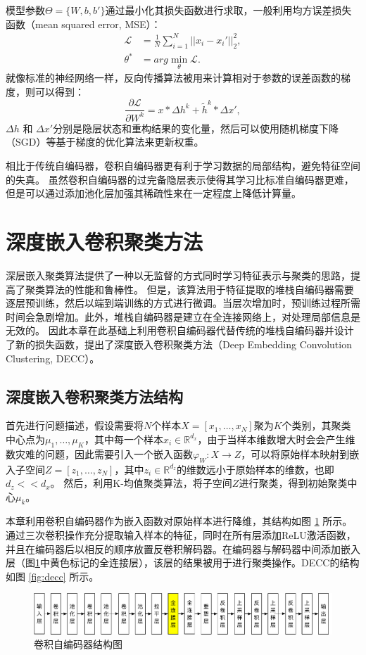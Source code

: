 模型参数$\Theta=\{{W},{b},{b'}\}$通过最小化其损失函数进行求取，一般利用均方误差损失函数（mean squared error, MSE）：
\begin{align}
	\mathscr{L} &= \frac{1}{N}\sum_{i=1}^N||x_i-x_i'||_2^2, \label{equ:mse_loss}\\
	\theta^* &= arg\min\limits_{\theta} \mathscr{L}.  \label{equ:mse}
\end{align}
就像标准的神经网络一样，反向传播算法被用来计算相对于参数的误差函数的梯度，则可以得到：
\begin{equation}
	\frac{\partial \mathscr{L}}{\partial W^k}=x * \Delta h ^k+\tilde{h}^k * \Delta x',
\end{equation}
$\Delta h$ 和 $\Delta x'$分别是隐层状态和重构结果的变化量，然后可以使用随机梯度下降（SGD）等基于梯度的优化算法来更新权重。

相比于传统自编码器，卷积自编码器更有利于学习数据的局部结构，避免特征空间的失真。
虽然卷积自编码器的过完备隐层表示使得其学习比标准自编码器更难，但是可以通过添加池化层加强其稀疏性来在一定程度上降低计算量。

\section{深度嵌入卷积聚类方法}
\label{sec:decc_method}
深层嵌入聚类算法提供了一种以无监督的方式同时学习特征表示与聚类的思路，提高了聚类算法的性能和鲁棒性。
但是，该算法用于特征提取的堆栈自编码器需要逐层预训练，然后以端到端训练的方式进行微调。当层次增加时，预训练过程所需时间会急剧增加。此外，堆栈自编码器是建立在全连接网络上，对处理局部信息是无效的。
因此本章在此基础上利用卷积自编码器代替传统的堆栈自编码器并设计了新的损失函数，提出了深度嵌入卷积聚类方法（Deep Embedding Convolution Clustering, DECC）。

\subsection{深度嵌入卷积聚类方法结构}
首先进行问题描述，假设需要将$N$个样本$X=[x_1,\dots,x_N]$聚为$K$个类别，其聚类中心点为$\mu_1,\dots,\mu_K$，其中每一个样本$x_i\in \mathbb{R}^{d_x}$，由于当样本维数增大时会会产生维数灾难的问题，因此需要引入一个嵌入函数$\varphi_W: X \rightarrow Z$，可以将原始样本映射到嵌入子空间$Z=[z_1,\dots,z_N]$，其中$z_i\in \mathbb{R}^{d_z}$的维数远小于原始样本的维数，也即$d_z<<d_x$。
然后，利用K-均值聚类算法，将子空间$Z$进行聚类，得到初始聚类中心${\mu_k}$。

本章利用卷积自编码器作为嵌入函数对原始样本进行降维，其结构如图 \ref{fig:cae} 所示。
通过三次卷积操作充分提取输入样本的特征，同时在所有层添加ReLU激活函数，并且在编码器后以相反的顺序放置反卷积解码器。在编码器与解码器中间添加嵌入层（图\ref{fig:cae}中黄色标记的全连接层），该层的结果被用于进行聚类操作。DECC的结构如图 \ref{fig:decc} 所示。
\begin{figure}[hbt]
	\centering
	\includegraphics[width=13.5cm]{figures/AE/cae}
	\caption{卷积自编码器结构图}
	\label{fig:cae}
\end{figure}

